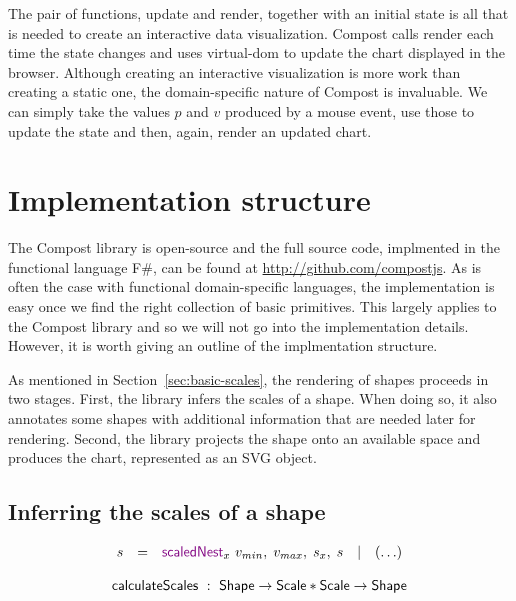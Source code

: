 \documentclass{jfp}
\newcommand{\ident}[1]{\textnormal{\textcolor{idclr}{\sffamily #1}}}
\newcommand{\kvd}[1]{\textnormal{\textcolor{kvdclr}{\sffamily #1}}}
\newcommand{\urrl}[1]{\textnormal{\textcolor{urlclr}{\url{#1}}}}
\begin{document}
The pair of functions, \ident{update} and \ident{render}, together with an initial state is
all that is needed to create an interactive data visualization. Compost calls
\ident{render} each time the state changes and uses virtual-dom to update the chart
displayed in the browser. Although creating an interactive visualization is more work than
creating a static one, the domain-specific nature of Compost is invaluable. We can
simply take the values $p$ and $v$ produced by a mouse event, use those to update the state
and then, again, render an updated chart.


\section{Implementation structure}
\label{sec:impl}

The Compost library is open-source and the full source code, implmented in the functional
language F\#, can be found at \urrl{http://github.com/compostjs}.
As is often the case with functional domain-specific languages, the implementation is easy once
we find the right collection of basic primitives. This largely applies to the Compost library
and so we will not go into the implementation details. However, it is worth giving an
outline of the implmentation structure.

As mentioned in Section~\ref{sec:basic-scales}, the rendering of shapes proceeds in two stages.
First, the library infers the scales of a shape. When doing so, it also annotates some shapes
with additional information that are needed later for rendering. Second, the library projects
the shape onto an available space and produces the chart, represented as an SVG object.

\subsection{Inferring the scales of a shape}

\begin{equation*}
\begin{array}{rclcl}
s &=& \kvd{scaledNest}_x~v_{min},\;v_{max},\;s_x,\;s &|& (\ldots)
\end{array}
\end{equation*}


\begin{equation*}
\ident{calculateScales} ~:~ \ident{Shape} \rightarrow \ident{Scale}*\ident{Scale}\rightarrow\ident{Shape}
\end{equation*}
\end{document}
